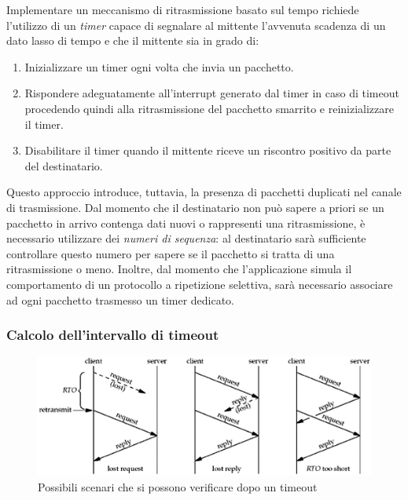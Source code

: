 \documentclass[10pt,a4paper, titlepage]{report}
\begin{document}
Implementare un meccanismo di ritrasmissione basato sul tempo richiede l'utilizzo di un \textit{timer} capace di segnalare al mittente l'avvenuta scadenza di un dato lasso di tempo e che il mittente sia in grado di:

\begin{enumerate}
\item Inizializzare un timer ogni volta che invia un pacchetto.
\item Rispondere adeguatamente all'interrupt generato dal timer in caso di timeout procedendo quindi alla ritrasmissione del pacchetto smarrito e reinizializzare il timer.
\item Disabilitare il timer quando il mittente riceve un riscontro positivo da parte del destinatario.
\end{enumerate}

Questo approccio introduce, tuttavia, la presenza di pacchetti duplicati nel canale di trasmissione. Dal momento che il destinatario non può sapere a priori se un pacchetto in arrivo contenga dati nuovi o rappresenti una ritrasmissione, è necessario utilizzare dei \textit{numeri di sequenza}: al destinatario sarà sufficiente controllare questo numero per sapere se il pacchetto si tratta di una ritrasmissione o meno. Inoltre, dal momento che l'applicazione simula il comportamento di un protocollo a ripetizione selettiva, sarà necessario  associare ad ogni pacchetto trasmesso un timer dedicato. 

\subsubsection{Calcolo dell'intervallo di timeout}\label{subsubsec:calc-timeout}

\begin{figure}
\centering
\includegraphics[width=\textwidth]{Timeout}
\caption{Possibili scenari che si possono verificare dopo un timeout}
\label{fig:Timeout}
\end{figure}
\end{document}
